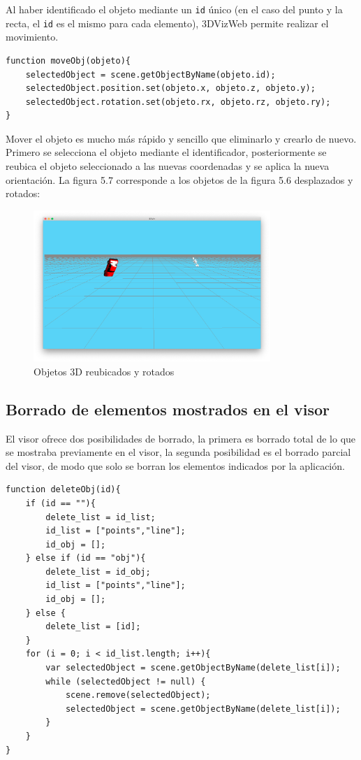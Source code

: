 Al haber identificado el objeto mediante un \texttt{id} único (en el caso del punto y la recta, el \texttt{id} es el mismo para cada elemento), 3DVizWeb permite realizar el movimiento.


\begin{lstlisting}[caption= Código para realizar el movimiento de los objetos 3D, label=cod.moverobjetos]
function moveObj(objeto){
	selectedObject = scene.getObjectByName(objeto.id);
	selectedObject.position.set(objeto.x, objeto.z, objeto.y);
	selectedObject.rotation.set(objeto.rx, objeto.rz, objeto.ry);
}
\end{lstlisting}

Mover el objeto es mucho más rápido y sencillo que eliminarlo y crearlo de nuevo. Primero se selecciona el objeto mediante el identificador, posteriormente se reubica el objeto seleccionado a las nuevas coordenadas y se aplica la nueva orientación. La figura 5.7 corresponde a los objetos de la figura 5.6 desplazados y rotados:

\begin{figure}[H]
  \begin{center}
    \includegraphics[width=0.8\textwidth]{figures/movermodelos.png}
		\caption{Objetos 3D reubicados y rotados}
		\label{fig.movermodelos}
		\end{center}
\end{figure}
\subsection{Borrado de elementos mostrados en el visor}
El visor ofrece dos posibilidades de borrado, la primera es borrado total de lo que se mostraba previamente en el visor, la segunda posibilidad es el borrado parcial del visor, de modo que solo se borran los elementos indicados por la aplicación.

\begin{lstlisting}[caption= Código para realizar el borrado de elementos mostrados en el visor, label=cod.borrarelementos]
function deleteObj(id){
	if (id == ""){
		delete_list = id_list;
		id_list = ["points","line"];
		id_obj = [];
	} else if (id == "obj"){
		delete_list = id_obj;
		id_list = ["points","line"];
		id_obj = [];
	} else {
		delete_list = [id];
	}
	for (i = 0; i < id_list.length; i++){
		var selectedObject = scene.getObjectByName(delete_list[i]);
		while (selectedObject != null) {
			scene.remove(selectedObject);
			selectedObject = scene.getObjectByName(delete_list[i]);
		}
	}
}
\end{lstlisting}

